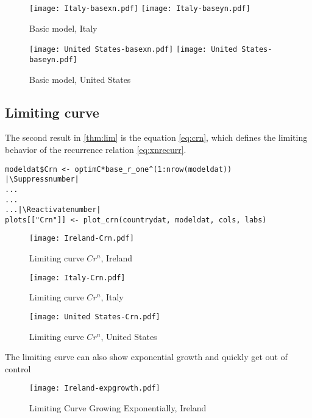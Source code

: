 \begin{figure}[H]
  \texttt{[image: Italy-basexn.pdf]} \label{fig:italy-basexn}
\endminipage\hfill
{}
  \texttt{[image: Italy-baseyn.pdf]} \label{fig:italy-baseyn}
\endminipage
\caption{Basic model, Italy}
\end{figure}

\begin{figure}[H]
  \texttt{[image: United States-basexn.pdf]} \label{fig:usa-basexn}
\endminipage\hfill
{}
  \texttt{[image: United States-baseyn.pdf]} \label{fig:usa-baseyn}
\endminipage
\caption{Basic model, United States}
\end{figure}

\subsection{Limiting curve}

The second result in \ref{thm:lim} is the equation \ref{eq:crn}, which defines the limiting behavior of the recurrence relation \ref{eq:xnrecurr}.

\begin{lstlisting}[breaklines = true, escapeinside=||, tabsize = 4, caption = {Algorithm for Limiting Curve}]
modeldat$Crn <- optimC*base_r_one^(1:nrow(modeldat))  |\Suppressnumber|
...
...
...|\Reactivatenumber|
plots[["Crn"]] <- plot_crn(countrydat, modeldat, cols, labs)
\end{lstlisting}

\begin{figure}[H]
\texttt{[image: Ireland-Crn.pdf]}
\caption{Limiting curve $Cr^n$, Ireland}
\endminipage 
{}
\texttt{[image: Italy-Crn.pdf]}
\caption{Limiting curve $Cr^n$, Italy}
\endminipage 
{}
\texttt{[image: United States-Crn.pdf]}
\caption{Limiting curve $Cr^n$, United States}
\endminipage 
\end{figure}

The limiting curve can also show exponential growth and quickly get out of control

\begin{figure}[H]
\texttt{[image: Ireland-expgrowth.pdf]}
\endminipage 
\caption{Limiting Curve Growing Exponentially, Ireland}
\end{figure}

